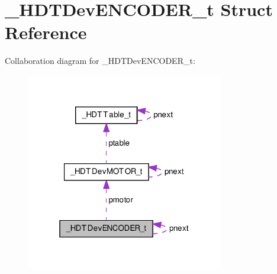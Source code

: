 \hypertarget{struct___h_d_t_dev_e_n_c_o_d_e_r__t}{\section{\-\_\-\-H\-D\-T\-Dev\-E\-N\-C\-O\-D\-E\-R\-\_\-t \-Struct \-Reference}
\label{struct___h_d_t_dev_e_n_c_o_d_e_r__t}
}


\-Collaboration diagram for \-\_\-\-H\-D\-T\-Dev\-E\-N\-C\-O\-D\-E\-R\-\_\-t\-:\nopagebreak
\begin{figure}[H]
\begin{center}
\leavevmode
\includegraphics[width=244pt]{struct___h_d_t_dev_e_n_c_o_d_e_r__t__coll__graph}
\end{center}
\end{figure}
